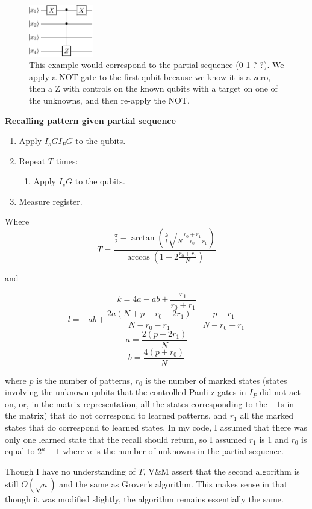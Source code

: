 \documentclass[11pt]{report}
\newcommand{\?}{\stackrel{?}{=}}
\begin{document}
\begin{figure}[!htb]
\centering
\includegraphics[width=0.25\textwidth]{resources/pdfs/assoc3-crop.pdf}
\caption{This example would correspond to the partial sequence (0 1 ? ?). We apply a NOT gate to the first qubit because we know it is a zero, then a Z with controls on the known qubits with a target on one of the unknowns, and then re-apply the NOT.}
\label{fig:digraph3}
\end{figure}

\begin{framed}
\textbf{Recalling pattern given partial sequence }
\begin{enumerate}
	\item Apply $I_sGI_PG$ to the qubits.
	\item Repeat $T$ times:
	\begin{enumerate}
		\item Apply $I_sG$ to the qubits.
	\end{enumerate}
	\item Measure register.
\end{enumerate}
\end{framed}

Where $$T=\frac{\frac{\pi}{2}-\arctan \left (\frac{k}{l}\sqrt{\frac{r_0+r_1}{N-r_0-r_1}} \right )}{\arccos \left ( 1-2\frac{r_0+r_1}{N} \right )}$$

and

$$k=4a-ab+\frac{r_1}{r_0+r_1}$$
$$l=-ab+\frac{2a(N+p-r_0-2r_1)}{N-r_0-r_1}-\frac{p-r_1}{N-r_0-r_1}$$
$$a=\frac{2(p-2r_1)}{N}$$
$$b=\frac{4(p+r_0)}{N}$$

where $p$ is the number of patterns, $r_0$ is the number of marked states (states involving the unknown qubits that the controlled Pauli-z gates in $I_P$ did not act on, or, in the matrix representation, all the states corresponding to the $-1$s in the matrix) that do not correspond to learned patterns, and $r_1$ all the marked states that do correspond to learned states. In my code, I assumed that there was only one learned state that the recall should return, so I assumed $r_1$ is 1 and $r_0$ is equal to $2^u-1$ where $u$ is the number of unknowns in the partial sequence.

Though I have no understanding of $T$, V\&M assert that the second algorithm is still $O(\sqrt{n})$ and the same as Grover's algorithm. This makes sense in that though it was modified slightly, the algorithm remains essentially the same.
\end{document}
